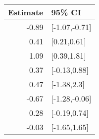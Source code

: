\begin{tabular}{rl}
  \hline
Estimate & 95\% CI \\ 
  \hline
-0.89 & [-1.07,-0.71] \\ 
  0.41 & [0.21,0.61] \\ 
  1.09 & [0.39,1.81] \\ 
  0.37 & [-0.13,0.88] \\ 
  0.47 & [-1.38,2.3] \\ 
  -0.67 & [-1.28,-0.06] \\ 
  0.28 & [-0.19,0.74] \\ 
  -0.03 & [-1.65,1.65] \\ 
   \hline
\end{tabular}

